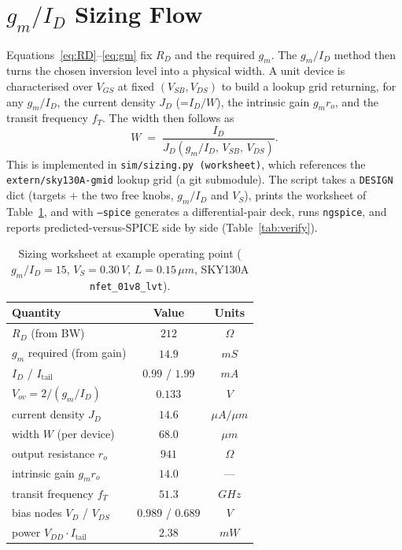\documentclass{article}
\begin{document}
\section{$g_m/I_D$ Sizing Flow}
\label{sec:flow}
Equations~\eqref{eq:RD}--\eqref{eq:gm} fix $R_D$ and the required $g_m$. The $g_m/I_D$
method then turns the chosen inversion level into a physical width. A unit device is
characterised over $V_{GS}$ at fixed $(V_{SB},V_{DS})$ to build a lookup grid returning,
for any $g_m/I_D$, the current density $J_D$ (=$I_D/W$), the intrinsic gain $g_m r_o$, and
the transit frequency $f_T$. The width then follows as
\begin{equation}
    W \;=\; \frac{I_D}{J_D(g_m/I_D,\,V_{SB},\,V_{DS})} .
    \label{eq:W}
\end{equation}
This is implemented in \texttt{sim/sizing.py (worksheet)}, which references the \texttt{extern/sky130A-gmid}
lookup grid (a git submodule). The script takes a \texttt{DESIGN} dict (targets $+$ the two free
knobs, $g_m/I_D$ and $V_S$), prints the worksheet of
Table~\ref{tab:sizing}, and with \texttt{--spice} generates a differential-pair deck,
runs \texttt{ngspice}, and reports predicted-versus-SPICE side by side
(Table~\ref{tab:verify}).

\begin{table}[H]
    \centering
    \caption{Sizing worksheet at example operating point ($g_m/I_D=15$,
             $V_S=0.30\,V$, $L=0.15\,\mu m$, SKY130A \texttt{nfet\_01v8\_lvt}).}
    \label{tab:sizing}
    \begin{tabular}{l|c|c} \hline
        \textbf{Quantity} & \textbf{Value} & \textbf{Units} \\ \hline
        $R_D$ (from BW) & $212$ & $\Omega$ \\ \hline
        $g_m$ required (from gain) & $14.9$ & $mS$ \\ \hline
        $I_D$ / $I_{\text{tail}}$ & $0.99$ / $1.99$ & $mA$ \\ \hline
        $V_{ov}=2/(g_m/I_D)$ & $0.133$ & $V$ \\ \hline
        current density $J_D$ & $14.6$ & $\mu A/\mu m$ \\ \hline
        width $W$ (per device) & $68.0$ & $\mu m$ \\ \hline
        output resistance $r_o$ & $941$ & $\Omega$ \\ \hline
        intrinsic gain $g_m r_o$ & $14.0$ & --- \\ \hline
        transit frequency $f_T$ & $51.3$ & $GHz$ \\ \hline
        bias nodes $V_D$ / $V_{DS}$ & $0.989$ / $0.689$ & $V$ \\ \hline
        power $V_{DD}\!\cdot\!I_{\text{tail}}$ & $2.38$ & $mW$ \\ \hline
    \end{tabular}
\end{table}
\end{document}
